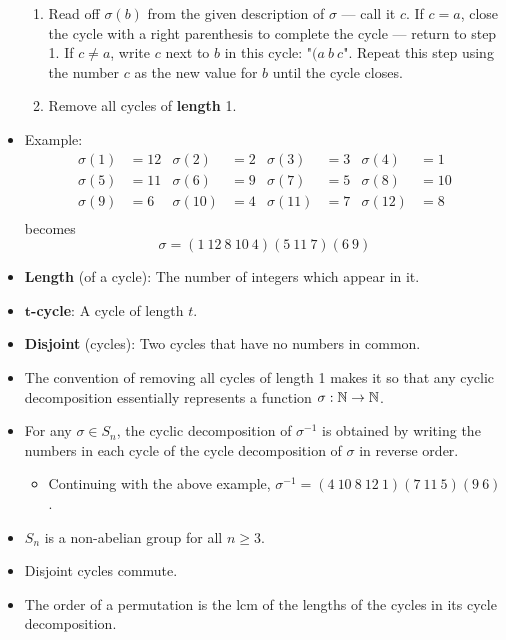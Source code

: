 \documentclass[../notes.tex]{subfiles}
\begin{document}
\begin{itemize}
\begin{enumerate}
        \item Read off $\sigma(b)$ from the given description of $\sigma$ --- call it $c$. If $c=a$, close the cycle with a right parenthesis to complete the cycle --- return to step 1. If $c\neq a$, write $c$ next to $b$ in this cycle: "$(a\ b\ c$". Repeat this step using the number $c$ as the new value for $b$ until the cycle closes.
        \item Remove all cycles of \textbf{length} 1.
    \end{enumerate}
    \item Example:
    \begin{align*}
        \sigma(1) &= 12&
            \sigma(2) &= 2&
                \sigma(3) &= 3&
                    \sigma(4) &= 1\\
        \sigma(5) &= 11&
            \sigma(6) &= 9&
                \sigma(7) &= 5&
                    \sigma(8) &= 10\\
        \sigma(9) &= 6&
            \sigma(10) &= 4&
                \sigma(11) &= 7&
                    \sigma(12) &= 8\\
    \end{align*}
    becomes
    \begin{equation*}
        \sigma = (1\ 12\ 8\ 10\ 4)(5\ 11\ 7)(6\ 9)
    \end{equation*}
    \item \textbf{Length} (of a cycle): The number of integers which appear in it.
    \item \textbf{$\bm{t}$-cycle}: A cycle of length $t$.
    \item \textbf{Disjoint} (cycles): Two cycles that have no numbers in common.
    \item The convention of removing all cycles of length 1 makes it so that any cyclic decomposition essentially represents a function $\sigma:\mathbb{N}\to\mathbb{N}$.
    \item For any $\sigma\in S_n$, the cyclic decomposition of $\sigma^{-1}$ is obtained by writing the numbers in each cycle of the cycle decomposition of $\sigma$ in reverse order.
    \begin{itemize}
        \item Continuing with the above example, $\sigma^{-1}=(4\ 10\ 8\ 12\ 1)(7\ 11\ 5)(9\ 6)$.
    \end{itemize}
    \item $S_n$ is a non-abelian group for all $n\geq 3$.
    \item Disjoint cycles commute.
    \item The order of a permutation is the lcm of the lengths of the cycles in its cycle decomposition.
\end{itemize}
\end{document}
